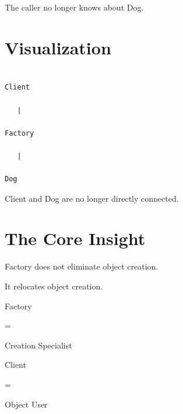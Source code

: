 \documentclass[11pt,a4paper]{book}
\begin{document}

The caller no longer knows
about Dog.


\section{Visualization}

\begin{verbatim}

Client

   |

Factory

   |

Dog

\end{verbatim}


Client and Dog are no longer
directly connected.


\section{The Core Insight}

Factory does not eliminate
object creation.


It relocates object creation.


\begin{mentalmodel}

Factory

=

Creation Specialist


Client

=

Object User

\end{mentalmodel}
\end{document}
